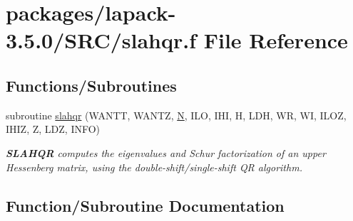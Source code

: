 \hypertarget{lapack-3_85_80_2SRC_2slahqr_8f}{}\section{packages/lapack-\/3.5.0/\+S\+R\+C/slahqr.f File Reference}
\label{lapack-3_85_80_2SRC_2slahqr_8f}
\subsection*{Functions/\+Subroutines}
\begin{DoxyCompactItemize}
\item 
subroutine \hyperlink{lapack-3_85_80_2SRC_2slahqr_8f_ae54e59a2d967d6ea7c589e7211ff0dc5}{slahqr} (W\+A\+N\+T\+T, W\+A\+N\+T\+Z, \hyperlink{polmisc_8c_a0240ac851181b84ac374872dc5434ee4}{N}, I\+L\+O, I\+H\+I, H, L\+D\+H, W\+R, W\+I, I\+L\+O\+Z, I\+H\+I\+Z, Z, L\+D\+Z, I\+N\+F\+O)
\begin{DoxyCompactList}\small\item\em {\bfseries S\+L\+A\+H\+Q\+R} computes the eigenvalues and Schur factorization of an upper Hessenberg matrix, using the double-\/shift/single-\/shift Q\+R algorithm. \end{DoxyCompactList}\end{DoxyCompactItemize}


\subsection{Function/\+Subroutine Documentation}
\hypertarget{lapack-3_85_80_2SRC_2slahqr_8f_ae54e59a2d967d6ea7c589e7211ff0dc5}{}
